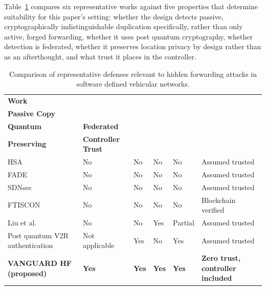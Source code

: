 \documentclass[final,5p,twocolumn]{elsarticle}
\theoremstyle{remark}
\theoremstyle{plain}
\begin{document}
Table~\ref{tab:vanguard_related} compares six representative works against
five properties that determine suitability for this paper's setting: whether
the design detects passive, cryptographically indistinguishable duplication
specifically, rather than only active, forged forwarding, whether it uses
post quantum cryptography, whether detection is federated, whether it
preserves location privacy by design rather than as an afterthought, and what
trust it places in the controller.

\begin{table}[!t]
	\centering
	\caption{Comparison of representative defenses relevant to hidden forwarding attacks in software defined vehicular networks.}
	\label{tab:vanguard_related}
	\renewcommand{\arraystretch}{1.25}
	\footnotesize
	\begin{tabular}{|>{\raggedright\arraybackslash}p{2.3cm}|>{\centering\arraybackslash}p{2.0cm}|>{\centering\arraybackslash}p{1.6cm}|>{\centering\arraybackslash}p{1.6cm}|>{\centering\arraybackslash}p{1.8cm}|>{\raggedright\arraybackslash}p{2.4cm}|}
		\hline
		\textbf{Work} & \makecell{\textbf{Detects}\\\textbf{Passive Copy}} & \makecell{\textbf{Post}\\\textbf{Quantum}} & \textbf{Federated} & \makecell{\textbf{Privacy}\\\textbf{Preserving}} & \textbf{Controller Trust} \\
		\hline
		HSA~\cite{Mohammadi2016} & No & No & No & No & Assumed trusted \\
		\hline
		FADE~\cite{Pang2016FADE} & No & No & No & No & Assumed trusted \\
		\hline
		SDNsec~\cite{Sasaki2016SDNsec} & No & No & No & No & Assumed trusted \\
		\hline
		FTISCON~\cite{Bargayary2023FTISCON} & No & No & No & No & Blockchain verified \\
		\hline
		Liu et al.~\cite{Liu2021BFLVEC} & No & No & Yes & Partial & Assumed trusted \\
		\hline
		Post quantum V2R authentication~\cite{ElDalahmeh2025} & Not applicable & Yes & No & Yes & Assumed trusted \\
		\hline
		\textbf{VANGUARD HF (proposed)} & \textbf{Yes} & \textbf{Yes} & \textbf{Yes} & \textbf{Yes} & \textbf{Zero trust, controller included} \\
		\hline
	\end{tabular}
\end{table}
\end{document}
